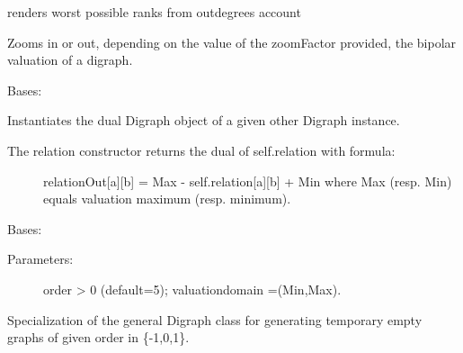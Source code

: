 \documentclass[letterpaper,10pt,english]{sphinxmanual}
\begin{document}
\begin{fulllineitems}
\begin{fulllineitems}
\end{fulllineitems}


\begin{fulllineitems}
\label{techDoc:digraphs.Digraph.worstRanks}
renders worst possible ranks from outdegrees account

\end{fulllineitems}


\begin{fulllineitems}
\label{techDoc:digraphs.Digraph.zoomValuation}
Zooms in or out, depending on the value of the zoomFactor provided,
the bipolar valuation of a digraph.

\end{fulllineitems}


\end{fulllineitems}


\begin{fulllineitems}
\label{techDoc:digraphs.DualDigraph}
Bases: {\hyperref[techDoc:digraphs.Digraph]{}}

Instantiates the dual Digraph object of a given other Digraph instance.
\begin{description}
\item[{The relation constructor returns the dual of self.relation with formula:}] \leavevmode
relationOut{[}a{]}{[}b{]} = Max - self.relation{[}a{]}{[}b{]} + Min
where Max (resp. Min) equals valuation maximum (resp. minimum).

\end{description}

\end{fulllineitems}


\begin{fulllineitems}
\label{techDoc:digraphs.EmptyDigraph}
Bases: {\hyperref[techDoc:digraphs.Digraph]{}}
\begin{description}
\item[{Parameters:}] \leavevmode
order \textgreater{} 0 (default=5); valuationdomain =(Min,Max).

\end{description}

Specialization of the general Digraph class for generating
temporary empty graphs of given order in \{-1,0,1\}.

\end{fulllineitems}
\end{document}
